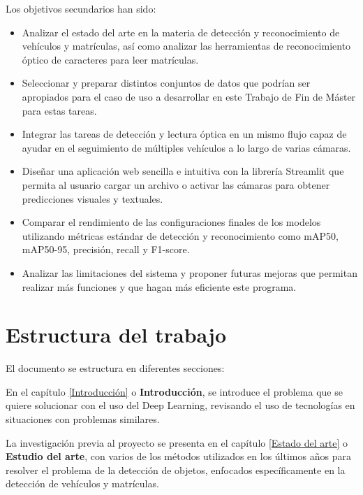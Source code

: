 \documentclass[12pt,a4paper,onecolumn,oneside]{report}
\begin{document}
Los objetivos secundarios han sido:
\begin{itemize}
    \item Analizar el estado del arte en la materia de detección y reconocimiento de vehículos y matrículas, así como analizar las herramientas de reconocimiento óptico de caracteres para leer matrículas.

    \item Seleccionar y preparar distintos conjuntos de datos que podrían ser apropiados para el caso de uso a desarrollar en este Trabajo de Fin de Máster para estas tareas.
    
    \item Integrar las tareas de detección y lectura óptica en un mismo flujo capaz de ayudar en el seguimiento de múltiples vehículos a lo largo de varias cámaras.
    
    \item Diseñar una aplicación web sencilla e intuitiva con la librería Streamlit que permita al usuario cargar un archivo o activar las cámaras para obtener predicciones visuales y textuales.
    
    \item Comparar el rendimiento de las configuraciones finales de los modelos utilizando métricas estándar de detección y reconocimiento como mAP50, mAP50-95, precisión, recall y F1-score.
    \item Analizar las limitaciones del sistema y proponer futuras mejoras que permitan realizar más funciones y que hagan más eficiente este programa.
\end{itemize}

\section{Estructura del trabajo}

El documento se estructura en diferentes secciones:

En el capítulo \ref{Introducción} o \textbf{Introducción}, se introduce el problema que se quiere solucionar con el uso del Deep Learning, revisando el uso de tecnologías en situaciones con problemas similares.

La investigación previa al proyecto se presenta en el capítulo \ref{Estado del arte} o \textbf{Estudio del arte}, con varios de los métodos utilizados en los últimos años para resolver el problema de la detección de objetos, enfocados específicamente en la detección de vehículos y matrículas.
\end{document}
